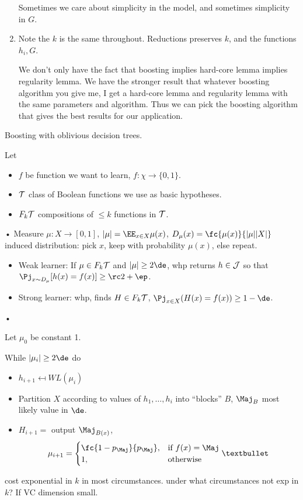 \begin{enumerate}
Sometimes we care about simplicity in the model, and sometimes simplicity in $G$.
\item
Note the $k$ is the same throughout. Reductions preserves $k$, and the functions $h_i, G$. 

We don't only have the fact that boosting implies hard-core lemma implies regularity lemma. We have the stronger result that whatever boosting algorithm you give me, I get a hard-core lemma and regularity lemma with the same parameters and algorithm. %
Thus we can pick the boosting algorithm that gives the best results for our application.
\end{enumerate}
Boosting with oblivious decision trees. 

Let
\begin{itemize}
\item
$f$ be function we want to learn, $f:\chi\to \{0,1\}$.
\item
$\cal T$ class of Boolean functions we use as basic hypotheses.
\item
$F_k\cal T$ compositions of $\le k$ functions in $\cal T$.
\end{itemize}•
Measure $\mu:X\to [0,1]$, $|\mu|=\EE_{x\in X}\mu(x)$, $D_\mu(x)=\fc{\mu(x)}{|\mu||X|}$ induced distribution: pick $x$, keep with probability $\mu(x)$, else repeat. 


\begin{itemize}
\item
Weak learner: If $\mu\in F_k\cal T$ and $|\mu|\ge 2\de$, whp returns $h\in \cal J$ so that $\Pj_{x\sim D_\mu}[h(x) = f(x)] \ge \rc2+\ep$.
\item
Strong learner: whp, finds $H\in F_k \cal T$, $\Pj_{x\in X} (H(x) = f(x)) \ge 1-\de$. 
\end{itemize}•

Let $\mu_0$ be constant 1. 

While $|\mu_i|\ge 2\de$ do
\begin{itemize}
\item
$h_{i+1}\mapsfrom WL(\mu_i)$
\item
Partition $X$ according to values of $h_1,\ldots,h_i$
into ``blocks'' $B$, $\Maj_B$ most likely value in $\de$.
%
\item
$H_{i+1}=$ output $\Maj_{B(x)}$, $$\mu_{i+1} = \begin{cases}
\fc{1-p_{\Maj}}{p_{\Maj}},&\text{if } f(x)=\Maj\\
1,&\text{otherwise}
\end{cases}• $$
\end{itemize}
cost exponential in $k$ in most circumstances. under what circumstances not exp in $k$? If VC dimension small.

